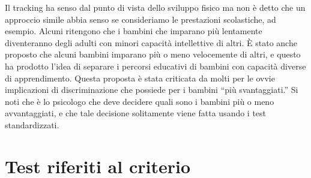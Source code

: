 %
%
%
%
%
%


Il tracking ha senso dal punto di vista dello sviluppo fisico ma non è detto che un approccio simile abbia senso se consideriamo le prestazioni scolastiche, ad esempio.
 Alcuni ritengono che i bambini che imparano più lentamente diventeranno degli adulti con minori capacità intellettive di altri.
È stato anche proposto che alcuni bambini imparano più o meno velocemente di altri, e questo ha prodotto l'idea di separare i percorsi educativi di bambini con capacità diverse di apprendimento.
Questa proposta è stata criticata da molti per le ovvie implicazioni di discriminazione che possiede per i bambini ``più svantaggiati.''
 Si noti che è lo psicologo che deve decidere quali sono i bambini più o meno avvantaggiati, e che tale decisione solitamente viene fatta usando i test standardizzati.



\section{Test riferiti al criterio}

